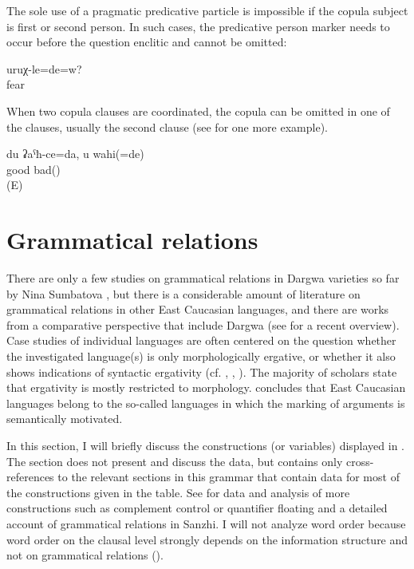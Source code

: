 The sole use of a pragmatic predicative particle is impossible if the copula subject is first or second person. In such cases, the predicative person marker needs to occur before the question enclitic and cannot be omitted:
%
\begin{exe}
	\ex	\label{ex:Are you afraid}
	\gll	uruχ-le=de=w?\\
		fear\\
	\glt	{}
\end{exe}

When two copula clauses are coordinated, the copula can be omitted in one of the clauses, usually the second clause  (see  for one more example).
%
\begin{exe}
	\ex	\label{ex:‎‎‎I am good, you (are) bad}
	\gll	du	ʡaˁħ-ce=da,	u	wahi(=de)\\
			good		bad()\\
	\glt	{} (E)
\end{exe}




\section{Grammatical relations}
\label{sec:Grammatical relations}

There are only a few studies on grammatical relations in Dargwa varieties so far by Nina Sumbatova \citep{Sumbatova2014, Sumbatova2017}, but there is a considerable amount of literature on grammatical relations in other East Caucasian languages, and there are works from a comparative perspective that include Dargwa (see \citealp{Forker2017} for a recent overview). Case studies of individual languages are often centered on the question whether the investigated language(s) is only morphologically ergative, or whether it also shows indications of syntactic ergativity (cf. \citealp{Nichols1980}, \citealp{Crisp1983}, \citealp{Comrie.etal2011}). The majority of scholars state that ergativity is mostly restricted to morphology. \citet{Kibrik1985, Kibrik1997, Kibrik2003} concludes that East Caucasian languages belong to the so-called  languages \citep[123]{Foley.vanValin1984} in which the marking of arguments is semantically motivated. 

In this section, I will briefly discuss the constructions (or variables) displayed in . The section does not present and discuss the data, but contains only cross-references to the relevant sections in this grammar that contain data for most of the constructions given in the table. See \citealp{Forker2019} for data and analysis of more constructions such as complement control or quantifier floating and a detailed account of grammatical relations in Sanzhi. I will not analyze word order because word order on the clausal level strongly depends on the information structure and not on grammatical relations (). 

